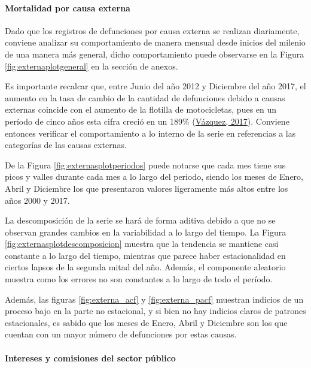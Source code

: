 \documentclass[
]{article}
\begin{document}
\paragraph{Mortalidad por causa externa}

Dado que los registros de defunciones por causa externa se realizan
diariamente, conviene analizar su comportamiento de manera mensual desde
inicios del milenio de una manera más general, dicho comportamiento
puede observarse en la Figura \ref{fig:externaplotgeneral} en la sección
de anexos.

Es importante recalcar que, entre Junio del año 2012 y Diciembre del año
2017, el aumento en la tasa de cambio de la cantidad de defunciones
debido a causas externas coincide con el aumento de la flotilla de
motocicletas, pues en un período de cinco años esta cifra creció en un
189\% (\protect\hyperlink{ref-motos}{Vázquez, 2017}). Conviene entonces
verificar el comportamiento a lo interno de la serie en referencias a
las categorías de las causas externas.

De la Figura \ref{fig:externasplotperiodos} puede notarse que cada mes
tiene sus picos y valles durante cada mes a lo largo del periodo, siendo
los meses de Enero, Abril y Diciembre los que presentaron valores
ligeramente más altos entre los años 2000 y 2017.

La descomposición de la serie se hará de forma aditiva debido a que no
se observan grandes cambios en la variabilidad a lo largo del tiempo. La
Figura \ref{fig:externasplotdescomposicion} muestra que la tendencia se
mantiene casi constante a lo largo del tiempo, mientras que parece haber
estacionalidad en ciertos lapsos de la segunda mitad del año. Además, el
componente aleatorio muestra como los errores no son constantes a lo
largo de todo el período.

Además, las figuras \ref{fig:externa_acf} y \ref{fig:externa_pacf}
muestran indicios de un proceso bajo en la parte no estacional, y si
bien no hay indicios claros de patrones estacionales, es sabido que los
meses de Enero, Abril y Diciembre son los que cuentan con un mayor
número de defunciones por estas causas.

\paragraph{Intereses y comisiones del sector público}
\end{document}
